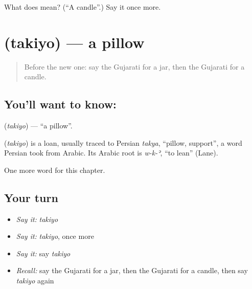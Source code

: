 \begin{tcolorbox}[breakable,colback=teal!4,colframe=teal!35!black,title={Before you move on}]
What does  mean? (\textquotedblleft{}A candle\textquotedblright{}.) Say it once more.
\end{tcolorbox}
\section[\texorpdfstring{\gu{તકિયો} (takiyo)}{તકિયો (takiyo)}]{ (takiyo) — a pillow}

\label{lesson:GU-C110-takiyo}



\begin{quote}
Before the new one: say the Gujarati for a jar, then the Gujarati for a candle.
\end{quote}

\subsection*{You'll want to know: }
\textbf{} (\emph{takiyo}) — \textquotedblleft{}a pillow\textquotedblright{}.

\begin{cousinweb}
\textbf{} (\emph{takiyo}) is a loan, usually traced to Persian \emph{takya}, \textquotedblleft{}pillow, support\textquotedblright{}, a word Persian took from Arabic. Its Arabic root is \emph{w-k-ʾ}, \textquotedblleft{}to lean\textquotedblright{} (Lane).
\end{cousinweb}

\begin{grammarlens}[title={What you've built}]
One more word for this chapter.
\end{grammarlens}

\subsection*{Your turn}
\begin{itemize}
\raggedright
  \item \emph{Say it:} \emph{takiyo}
  \item \emph{Say it:} \emph{takiyo}, once more
  \item \emph{Say it:} say \emph{takiyo}
  \item \emph{Recall:} say the Gujarati for a jar, then the Gujarati for a candle, then say \emph{takiyo} again
\end{itemize}

